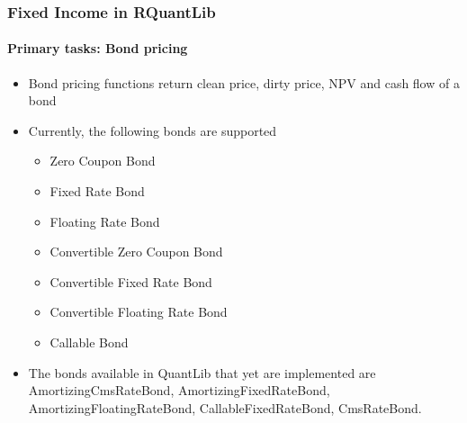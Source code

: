 \documentclass[smaller,compress, 9pt]{beamer}
\begin{document}
\begin{frame}
	\frametitle{Fixed Income in RQuantLib}
	\framesubtitle{Primary tasks: Bond pricing}
	\begin{itemize}
		\item Bond pricing functions return clean price, dirty price, NPV and cash flow of a bond
		\item Currently, the following bonds are supported
			\begin{itemize}
				\item Zero Coupon Bond
				\item Fixed Rate Bond
				\item Floating Rate Bond
				\item Convertible Zero Coupon Bond
				\item Convertible Fixed Rate Bond												
				\item Convertible Floating Rate Bond
				\item Callable Bond
			\end{itemize}
		\item The bonds available in QuantLib that yet are implemented are AmortizingCmsRateBond, AmortizingFixedRateBond, AmortizingFloatingRateBond, CallableFixedRateBond, CmsRateBond.
	\end{itemize}
\end{frame}
\end{document}
